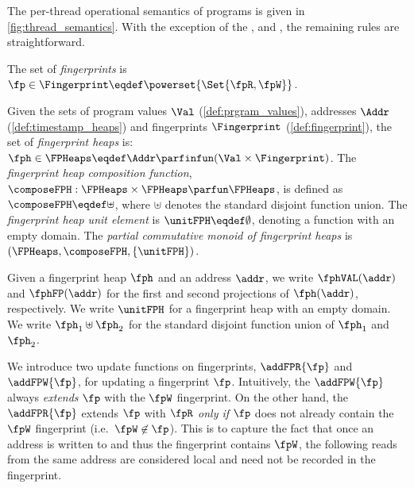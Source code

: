 The per-thread operational semantics of programs is given in \fig\ref{fig:thread_semantics}.
With the exception of the ,  and , the remaining rules are straightforward.



\begin{defn}[Fingerprints]
The set of \emph{fingerprints} is $\fp \in \Fingerprint \eqdef \powerset{\Set{\fpR,\fpW}}$.
\end{defn}
 
\begin{defn}
\label{def:fingerprint_heaps}
Given the sets of program values $\Val$ (\ref{def:prgram_values}), addresses $\Addr$ (\ref{def:timestamp_heaps}) and fingerprints $\Fingerprint$ (\ref{def:fingerprint}), the set of \emph{fingerprint heaps} is: $\fph \in \FPHeaps \eqdef \Addr \parfinfun (\Val \times \Fingerprint)$.
The \emph{fingerprint heap composition function}, $\composeFPH: \FPHeaps \times \FPHeaps \parfun \FPHeaps$, is defined as $\composeFPH \eqdef \uplus$, where $\uplus$ denotes the standard disjoint function union. The \emph{fingerprint heap unit element} is $\unitFPH \eqdef \emptyset$, denoting a function with an empty domain.
The \emph{partial commutative monoid of fingerprint heaps} is $(\FPHeaps, \composeFPH, \{\unitFPH\})$.  
\end{defn}
 
Given a fingerprint heap $\fph$ and an address $\addr$, we write $\fphVAL(\addr)$ and $\fphFP(\addr)$ for the first and second projections of $\fph(\addr)$, respectively. We write $\unitFPH$ for a fingerprint heap with an empty domain. We write $\fph_1 \uplus \fph_2$ for the standard disjoint function union of $\fph_1$ and $\fph_2$. 

We introduce two update functions on fingerprints, $\addFPR{\fp}$ and $\addFPW{\fp}$, for updating a fingerprint $\fp$. Intuitively, the $\addFPW{\fp}$ always \emph{extends} $\fp$ with the $\fpW$ fingerprint. On the other hand, the $\addFPR{\fp}$ extends $\fp$ with $\fpR$ \emph{only if} $\fp$ does not already contain the $\fpW$ fingerprint (i.e.~$\fpW \not\in \fp$). This is to capture the fact that once an address is written to and thus the fingerprint contains $\fpW$, the following reads from the same address are considered local and need not be recorded in the fingerprint.
 
